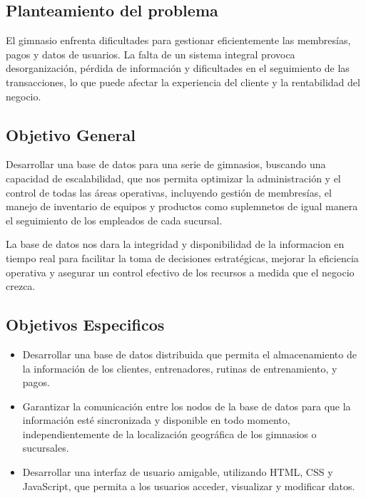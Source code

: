 \documentclass[spanish, 12pt]{article}
\providecommand{\tightlist}{\setlength{\itemsep}{0pt}
\setlength{\parskip}{0pt}}
\begin{document}
	\subsection{Planteamiento del problema}
	\label{planteamiento-del-problema}

	El gimnasio enfrenta dificultades para gestionar eficientemente las membresías,
	pagos y datos de usuarios. La falta de un sistema integral provoca
	desorganización, pérdida de información y dificultades en el seguimiento de las
	transacciones, lo que puede afectar la experiencia del cliente y la
	rentabilidad del negocio.

	\subsection{Objetivo General}
	\label{objetivo-general}

	Desarrollar una base de datos para una serie de gimnasios, buscando una
	capacidad de escalabilidad, que nos permita optimizar la administración y el control
	de todas las áreas operativas, incluyendo gestión de membresías, el manejo de inventario
	de equipos y productos como suplemnetos de igual manera el seguimiento de los empleados
	de cada sucursal.

	La base de datos nos dara la integridad y disponibilidad de la informacion en tiempo
	real para facilitar la toma de decisiones estratégicas, mejorar la eficiencia
	operativa y asegurar un control efectivo de los recursos a medida que el
	negocio crezca.

	\subsection{Objetivos Especificos}
	\label{objetivos-especificos}

	\begin{itemize}
		\tightlist

		\item Desarrollar una base de datos distribuida que permita el almacenamiento
			de la información de los clientes, entrenadores, rutinas de entrenamiento,
			y pagos.

		\item Garantizar la comunicación entre los nodos de la base de datos para que
			la información esté sincronizada y disponible en todo momento,
			independientemente de la localización geográfica de los gimnasios o
			sucursales.

		\item Desarrollar una interfaz de usuario amigable, utilizando HTML, CSS y JavaScript,
			que permita a los usuarios acceder, visualizar y modificar datos.
	\end{itemize}
\end{document}
